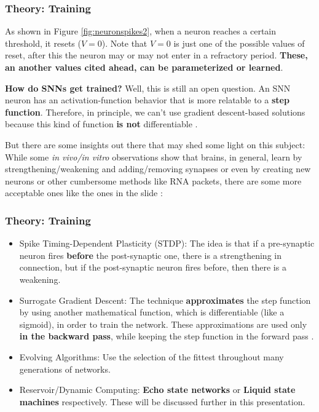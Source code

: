 \begin{frame}
	\frametitle{Theory: Training}
	\par As shown in Figure \ref{fig:neuronspikes2}, when a neuron reaches a certain threshold, it resets ($V = 0$). Note that $V=0$ is just one of the possible values of reset, after this the neuron may or may not enter in a refractory period. \textbf{These, an another values cited ahead, can be parameterized or learned}.\newline
	
	\par \textbf{How do SNNs get trained?} Well, this is still an open question. An SNN neuron has an activation-function behavior that is more relatable to a \textbf{step function}. Therefore, in principle, we can't use gradient descent-based solutions because this kind of function \textbf{is not} differentiable \cite{kasabov2019time}.\newline
	
	\par But there are some insights out there that may shed some light on this subject: While some \textit{in vivo/in vitro} observations show that brains, in general, learn by strengthening/weakening and adding/removing synapses or even by creating new neurons or other cumbersome methods like RNA packets, there are some more acceptable ones like the ones in the slide \cite{kasabov2019time}:

\end{frame}

\begin{frame}
	\frametitle{Theory: Training}
	\begin{itemize}
		\item Spike Timing-Dependent Plasticity (STDP): The idea is that if a pre-synaptic neuron fires \textbf{before} the post-synaptic one, there is a strengthening in connection, but if the post-synaptic neuron fires before, then there is a weakening.
		\item Surrogate Gradient Descent: The technique \textbf{approximates} the step function by using another mathematical function, which is differentiable (like a sigmoid), in order to train the network. These approximations are used only \textbf{in the backward pass}, while keeping the step function in the forward pass \cite{kasabov2019time}.
		\item Evolving Algorithms: Use the selection of the fittest throughout many generations of networks.
		\item Reservoir/Dynamic Computing: \textbf{Echo state networks} or \textbf{Liquid state machines} respectively. These will be discussed further in this presentation.
	\end{itemize}
\end{frame}

